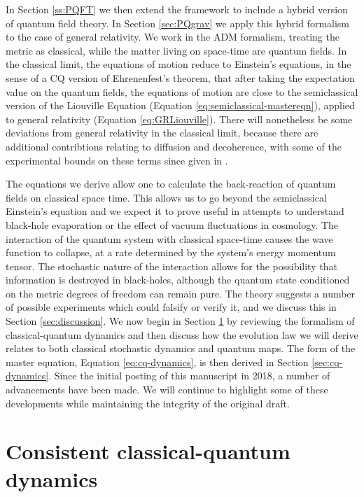 \documentclass[aps,pra,showpacs,citeautoscript,amsmath,amssymb,floatfix,superscriptaddress,bbm, verbatim,amsfonts,changes,12pt,nofootinbib,longbibliography]{revtex4-2}
\begin{document}
In Section \ref{ss:PQFT} we then extend the framework to include a hybrid version of quantum field theory. In Section \ref{sec:PQgrav} we apply this hybrid formalism to the case of general relativity. We work in the ADM formalism\cite{arnowitt2008republication}, treating the metric as classical, while the matter living on space-time are quantum fields. %
	In the classical limit, the  equations of motion reduce to Einstein's equations, in the sense of a CQ version of Ehrenenfest's theorem, that after taking the expectation value on the quantum fields, the equations of motion are close to the semiclassical version of the Liouville Equation (Equation \eqref{eq:semiclassical-mastereqn}), applied to general relativity (Equation \eqref{eq:GRLiouville}).
There will nonetheless be some deviations from general relativity in the classical limit, because there are additional contribtions relating to diffusion and decoherence, with some of the experimental bounds on these terms since given in \cite{oppenheim2021gravitationally}.
\label{par:Climit}

The equations we derive allow one to calculate the back-reaction of quantum fields on classical space time. This allows us to go beyond the semiclassical Einstein's equation and we expect it to prove useful in attempts to understand black-hole evaporation or the effect of vacuum fluctuations in cosmology.
 The interaction of the quantum system with classical space-time causes the wave function to collapse, at a rate determined by the system's energy momentum tensor. The stochastic nature of the interaction allows for the possibility that information is destroyed in black-holes, although the quantum state conditioned on the metric degrees of freedom can remain pure. The theory suggests a number of possible experiments which could falsify or verify it, and we discuss this in Section \ref{sec:discussion}.
We now begin in Section \ref{sec:cq-review} by reviewing the formalism of classical-quantum dynamics and then discuss how the evolution law we will derive relates to both classical stochastic dynamics and quantum maps. The form of the master equation, Equation \eqref{eq:cq-dynamics}, is then derived in Section \ref{sec:cq-dynamics}. 
Since the initial posting of this manuscript in 2018\cite{oppenheim2018postArxiv}, a number of advancements have been made. We will continue to highlight some of these developments while maintaining the integrity of the original draft.



 
\section{Consistent classical-quantum dynamics}
\label{sec:cq-review}
\end{document}
